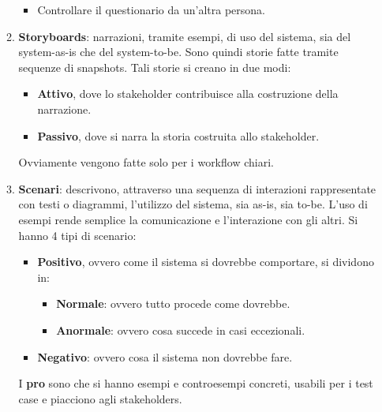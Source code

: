 \begin{itemize}
\begin{enumerate}
\begin{itemize}
                              \item Controllare il questionario da un'altra persona.
                        \end{itemize}
                  \item \textbf{Storyboards}: narrazioni, tramite esempi, di uso
                        del sistema, sia del system-as-is che del system-to-be.
                        Sono quindi storie fatte tramite sequenze di snapshots.
                        Tali storie si creano in due modi:
                        \begin{itemize}
                              \item \textbf{Attivo}, dove lo stakeholder contribuisce
                                    alla costruzione della narrazione.
                              \item \textbf{Passivo}, dove si narra la storia
                                    costruita allo stakeholder.
                        \end{itemize}
                        Ovviamente vengono fatte solo per i workflow chiari.
                  \item \textbf{Scenari}: descrivono, attraverso una sequenza di
                        interazioni rappresentate con testi o diagrammi, l'utilizzo
                        del sistema, sia as-is, sia to-be. L'uso di esempi rende
                        semplice la comunicazione e l'interazione con gli altri.
                        Si hanno 4 tipi di scenario:
                        \begin{itemize}
                              \item \textbf{Positivo}, ovvero come il sistema si
                                    dovrebbe comportare, si dividono in:
                                    \begin{itemize}
                                          \item \textbf{Normale}: ovvero tutto
                                                procede come dovrebbe.
                                          \item \textbf{Anormale}: ovvero cosa
                                                succede in casi eccezionali.
                                    \end{itemize}
                              \item \textbf{Negativo}: ovvero cosa il sistema
                                    non dovrebbe fare.
                        \end{itemize}
                        I \textbf{pro} sono che si hanno esempi e controesempi
                        concreti, usabili per i test case e piacciono agli
                        stakeholders.


\end{enumerate}
\end{itemize}
